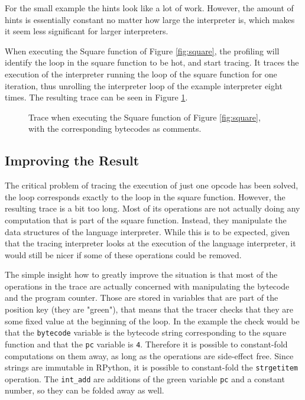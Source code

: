 \documentclass{acm_proc_article-sp}
\begin{document}
For the small example the hints look like a lot of work. However, the amount of
hints is essentially constant no matter how large the interpreter is, which
makes it seem less significant for larger interpreters.

When executing the Square function of Figure \ref{fig:square}, the profiling
will identify the loop in the square function to be hot, and start tracing. It
traces the execution of the interpreter running the loop of the square function
for one iteration, thus unrolling the interpreter loop of the example
interpreter eight times. The resulting trace can be seen in Figure 
\ref{fig:trace-no-green-folding}.

\begin{figure}

\vspace{-0.4cm}
\caption{Trace when executing the Square function of Figure \ref{fig:square},
with the corresponding bytecodes as comments.}
\label{fig:trace-no-green-folding}
\end{figure}

\subsection{Improving the Result}

The critical problem of tracing the execution of just one opcode has been
solved, the loop corresponds exactly to the loop in the square function.
However, the resulting trace is a bit too long. Most of its operations are not
actually doing any computation that is part of the square function. Instead,
they manipulate the data structures of the language interpreter. While this is
to be expected, given that the tracing interpreter looks at the execution of the
language interpreter, it would still be nicer if some of these operations could
be removed.

The simple insight how to greatly improve the situation is that most of the
operations in the trace are actually concerned with manipulating the
bytecode and the program counter. Those are stored in variables that are part of
the position key (they are "green"), that means that the tracer checks that they
are some fixed value at the beginning of the loop. In the example the check
would be that the \texttt{bytecode} variable is the bytecode string
corresponding to the square function and that the \texttt{pc} variable is
\texttt{4}. Therefore it is possible to constant-fold computations on them away,
as long as the operations are side-effect free. Since strings are immutable in
RPython, it is possible to constant-fold the \texttt{strgetitem} operation. The
\texttt{int\_add} are additions of the green variable \texttt{pc} and a constant
number, so they can be folded away as well.
\end{document}
